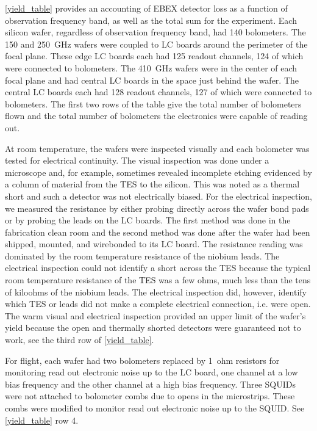 \TAB\ref{yield_table} provides an accounting of \ac{EBEX} detector loss as a function of observation frequency band, as well as the total sum for the experiment.
Each silicon wafer, regardless of observation frequency band, had 140 bolometers. %
The 150 and 250~GHz wafers were coupled to \ac{LC} boards around the perimeter of the focal plane. These edge \ac{LC} boards each had 125 readout channels, 124 of which were connected to bolometers.  
The 410~GHz wafers were in the center of each focal plane and had central \ac{LC} boards in the space just behind the wafer. The central \ac{LC} boards each had 128 readout channels, 127 of which were connected to bolometers. %
The first two rows of the table give the total number of bolometers flown and the total number of bolometers the electronics were capable of reading out. 

At room temperature, the wafers were inspected visually and each bolometer was tested for electrical continuity. 
The visual inspection was done under a microscope and, for example, sometimes revealed incomplete etching evidenced by a column of material from the \ac{TES} to the silicon. 
This was noted as a thermal short and such a detector was not electrically biased. 
For the electrical inspection, we measured the resistance by either probing directly across the wafer bond pads or by probing the leads on the \ac{LC} boards. 
The first method was done in the fabrication clean room and the second method was done after the wafer had been shipped, mounted, and wirebonded to its \ac{LC} board. 
The resistance reading was dominated by the room temperature resistance of the niobium leads. 
The electrical inspection could not identify a short across the \ac{TES} because the typical room temperature resistance of the \ac{TES} was a few ohms, much less than the tens of kiloohms of the niobium leads. 
The electrical inspection did, however, identify which \ac{TES} or leads did not make a complete electrical connection, i.e. were open. 
The warm visual and electrical inspection provided an upper limit of the wafer's yield because the open and thermally shorted detectors were guaranteed not to work, see the third row of \TAB\ref{yield_table}. 

For flight, each wafer had two bolometers replaced by 1~ohm resistors for monitoring read out electronic noise up to the \ac{LC} board, one channel at a low bias frequency and the other channel at a high bias frequency. 
Three \ac{SQUID}s were not attached to bolometer combs due to opens in the microstrips. These combs were modified to monitor read out electronic noise up to the \ac{SQUID}. See \TAB\ref{yield_table} row 4. 

